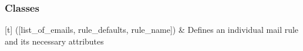 \documentclass[letterpaper,10pt,english]{sphinxmanual}
\begin{document}
\subsubsection*{Classes}


\begin{savenotes}\sphinxattablestart
\sphinxthistablewithglobalstyle
\sphinxthistablewithnovlinesstyle
\centering
\begin{tabulary}{\linewidth}[t]{}
\sphinxtoprule
\sphinxtableatstartofbodyhook
\sphinxAtStartPar
{\hyperref[\detokenize{_autosummary/gmail_rules.rules.rule:gmail_rules.rules.rule.Rule}]{}}({[}list\_of\_emails, rule\_defaults, rule\_name{]})
&
\sphinxAtStartPar
Defines an individual mail rule and its necessary attributes
\\
\sphinxbottomrule
\end{tabulary}
\sphinxtableafterendhook\par
\sphinxattableend\end{savenotes}
\end{document}
